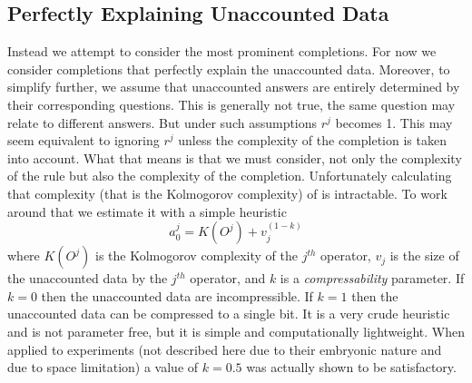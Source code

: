 \documentclass[runningheads]{llncs}
\begin{document}
\subsection{Perfectly Explaining Unaccounted Data}
Instead we attempt to consider the most prominent completions.  For
now we consider completions that perfectly explain the unaccounted
data. Moreover, to simplify further, we assume that unaccounted
answers are entirely determined by their corresponding questions. This
is generally not true, the same question may relate to different
answers. But under such assumptions $r^j$ becomes 1. This may seem
equivalent to ignoring $r^j$ unless the complexity of the completion
is taken into account. What that means is that we must consider, not
only the complexity of the rule but also the complexity of the
completion. Unfortunately calculating that complexity (that is the
Kolmogorov complexity) of is intractable. To work around that we
estimate it with a simple heuristic
\begin{equation}
a^j_0 = K(O^j) + v_j^{(1-k)}
\end{equation}
where $K(O^j)$ is the Kolmogorov complexity of the $j^{th}$ operator,
$v_j$ is the size of the unaccounted data by the $j^{th}$ operator,
and $k$ is a \emph{compressability} parameter. If $k=0$ then the
unaccounted data are incompressible. If $k=1$ then the unaccounted
data can be compressed to a single bit. It is a very crude heuristic
and is not parameter free, but it is simple and computationally
lightweight. When applied to experiments (not described here due to
their embryonic nature and due to space limitation) a value of $k=0.5$
was actually shown to be satisfactory.
\end{document}
